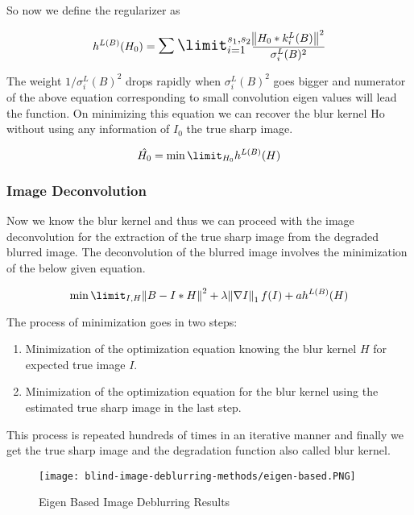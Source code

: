 \documentclass{article}
\begin{document}
So now we define the regularizer as 

\begin{equation}
    h^{L(B)}(H_0) = \mathlarger{\mathlarger{\sum\limit_{i=1}^{s_1, s_2}}} \frac{\norm{H_0 * k_i^L(B)}^2}{\sigma_i^L(B)^2}
\end{equation}

The weight $1 / \sigma_i^L(B)^2$ drops rapidly when $\sigma_i^L(B)^2$ goes bigger and numerator of the above equation corresponding to small convolution eigen values will lead the function. On minimizing this equation we can recover the blur kernel Ho without using any information of $I_0$ the true sharp image. 

\begin{equation}
    \hat{H_0} = \min\limit_{H_0} h^{L(B)}(H)
\end{equation}

\subsubsection{Image Deconvolution}

Now we know the blur kernel and thus we can proceed with the image deconvolution for the extraction of the true sharp image from the degraded blurred image. The deconvolution of the blurred image involves the minimization of the below given equation. 

\begin{equation}
    \min\limit_{I, H} \norm{B - I * H}^2 + \lambda \norm{\nabla I}_1 f(I) + a h^{L(B)}(H)
\end{equation}

The process of minimization goes in two steps: 

\begin{enumerate}
    \item Minimization of the optimization equation knowing the blur kernel $H$ for expected true image $I$. 
    \item Minimization of the optimization equation for the blur kernel using the estimated true sharp image in the last step. 
\end{enumerate}

This process is repeated hundreds of times in an iterative manner and finally we get the true sharp image and the degradation function also called blur kernel. 

\begin{figure}[ht]
    \centering
    \texttt{[image: blind-image-deblurring-methods/eigen-based.PNG]}
    \caption{Eigen Based Image Deblurring Results}
    \label{fig:eigen-based}
\end{figure}
\end{document}
